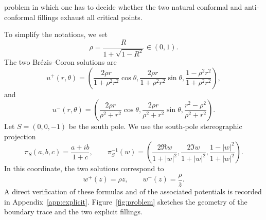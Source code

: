 \documentclass[11pt]{amsart}
\numberwithin{equation}{section}
\theoremstyle{remark}
\begin{document}
problem in which one has to decide whether the two natural conformal and anti-conformal fillings exhaust all critical points.

To simplify the notations, we set
\[
 \rho=\frac{R}{1+\sqrt{1-R^2}}\in(0,1).
\]
The two Br\'ezis--Coron solutions are
\[
 u^+(r,\theta)=
 \left(
 \frac{2\rho r}{1+\rho^2r^2}\cos\theta,
 \frac{2\rho r}{1+\rho^2r^2}\sin\theta,
 \frac{1-\rho^2r^2}{1+\rho^2r^2}
 \right),
\]
and
\[
 u^-(r,\theta)=
 \left(
 \frac{2\rho r}{\rho^2+r^2}\cos\theta,
 \frac{2\rho r}{\rho^2+r^2}\sin\theta,
 \frac{r^2-\rho^2}{\rho^2+r^2}
 \right).
\]
Let $S=(0,0,-1)$ be the south pole. We use the south-pole stereographic projection
\[
 \pi_S(a,b,c)=\frac{a+ib}{1+c},
 \qquad
 \pi_S^{-1}(w)=\left(
 \frac{2\Re w}{1+|w|^2},
 \frac{2\Im w}{1+|w|^2},
 \frac{1-|w|^2}{1+|w|^2}
 \right).
\]
In this coordinate, the two solutions correspond to
\[
 w^+(z)=\rho z,
 \qquad
 w^-(z)=\frac{\rho}{\bar z}.
\]
A direct verification of these formulas and of the associated potentials is recorded in Appendix~\ref{app:explicit}. Figure~\ref{fig:problem}
sketches the geometry of the boundary trace and the two explicit fillings.
\end{document}
